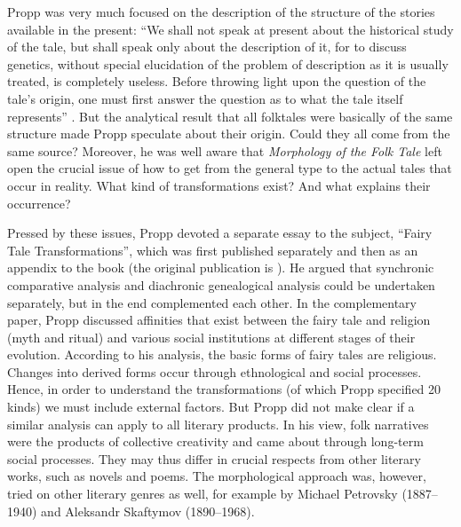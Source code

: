 \documentclass[output=paper]{langscibook}
\begin{document}
Propp was very much focused on the description of the structure of the stories available in the present: ``We shall not speak at present about the historical study of the tale, but shall speak only about the description of it, for to discuss genetics, without special elucidation of the problem of description as it is usually treated, is completely useless. Before throwing light upon the question of the tale's origin, one must first answer the question as to what the tale itself represents'' \citep[5]{Propp1968}. But the analytical result that all folktales were basically of the same structure made Propp speculate about their origin. Could they all come from the same source? Moreover, he was well aware that \emph{Morphology of the Folk Tale} left open the crucial issue of how to get from the general type to the actual tales that occur in reality. What kind of transformations exist? And what explains their occurrence? 

Pressed by these issues, Propp devoted a separate essay to the subject, ``Fairy Tale Transformations'', which was first published separately and then as an appendix to the book (the original publication is \citealt{Propp1928}). He argued that synchronic comparative analysis and diachronic genealogical analysis could be undertaken separately, but in the end complemented each other. In the complementary paper, Propp discussed affinities that exist between the fairy tale and religion (myth and ritual) and various social institutions at different stages of their evolution. According to his analysis, the basic forms of fairy tales are religious. Changes into derived forms occur through ethnological and social processes. Hence, in order to understand the transformations (of which Propp specified 20 kinds) we must include external factors. But Propp did not make clear if a similar analysis can apply to all literary products. In his view, folk narratives were the products of collective creativity and came about through long-term social processes. They may thus differ in crucial respects from other literary works, such as novels and poems. The morphological approach was, however, tried on other literary genres as well, for example by Michael Petrovsky (1887--1940) and Aleksandr Skaftymov (1890--1968).  
\end{document}
